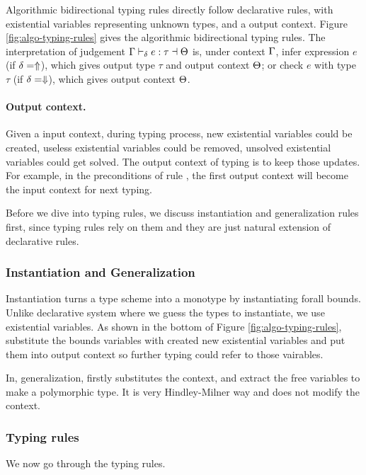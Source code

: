 Algorithmic bidirectional typing rules directly follow declarative rules, with existential variables representing unknown types, and a output context. Figure \ref{fig:algo-typing-rules} gives the algorithmic bidirectional typing rules. The interpretation of judgement $\tpreall e:\tau \toctx \trto t$ is, under context $\tctx$, infer expression $e$ (if $\delta = \Inf$), which gives output type $\tau$ and output context $\ctxl$; or check $e$ with type $\tau$ (if $\delta = \Chk$), which gives output context $\ctxl$.

\paragraph{Output context.}
Given a input context, during typing process, new existential variables could be created, useless existential variables could be removed, unsolved existential variables could get solved. The output context of typing is to keep those updates. For example, in the preconditions of rule , the first output context will become the input context for next typing.

Before we dive into typing rules, we discuss instantiation and generalization rules first, since typing rules rely on them and they are just natural extension of declarative rules.

\subsubsection{Instantiation and Generalization}

Instantiation turns a type scheme into a monotype by instantiating forall bounds. Unlike declarative system where we guess the types to instantiate, we use existential variables. As shown in the bottom of Figure \ref{fig:algo-typing-rules},  substitute the bounds variables with created new existential variables and put them into output context so further typing could refer to those vairables.

In, generalization,  firstly substitutes the context, and extract the free variables to make a polymorphic type. It is very Hindley-Milner way and does not modify the context.

\subsubsection{Typing rules}

We now go through the typing rules.


